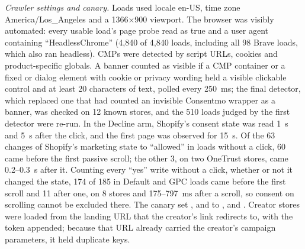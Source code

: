 \documentclass[preprint,11pt,authoryear,a4paper]{elsarticle}
\begin{document}
\emph{Crawler settings and canary.} Loads used locale en-US, time zone America/Los\_Angeles and a 1366$\times$900 viewport. The browser was visibly automated: every usable load's page probe read  as true and a user agent containing ``HeadlessChrome'' (4,840 of 4,840 loads, including all 98 Brave loads, which also ran headless). CMPs were detected by script URLs, cookies and product-specific globals. A banner counted as visible if a CMP container or a fixed or dialog element with cookie or privacy wording held a visible clickable control and at least 20 characters of text, polled every 250~ms; the final detector, which replaced one that had counted an invisible Consentmo wrapper as a banner, was checked on 12 known stores, and the 510 loads judged by the first detector were re-run. In the Decline arm, Shopify's consent state was read 1~s and 5~s after the click, and the first page was observed for 15~s. Of the 63 changes of Shopify's marketing state to ``allowed'' in loads without a click, 60 came before the first passive scroll; the other 3, on two OneTrust stores, came 0.2--0.3~s after it. Counting every ``yes'' write without a click, whether or not it changed the state, 174 of 185 in Default and GPC loads came before the first scroll and 11 after one, on 8 stores and 175--797~ms after a scroll, so consent on scrolling cannot be excluded there. The canary set ,  and  to ,  and . Creator stores were loaded from the landing URL that the creator's link redirects to, with the token appended; because that URL already carried the creator's campaign parameters, it held duplicate  keys.
\end{document}
